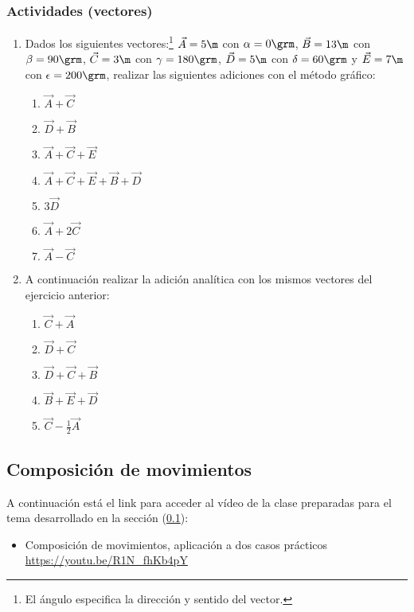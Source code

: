 \subsubsection*{Actividades (vectores)}
\small
\begin{enumerate}
  \item Dados los siguientes vectores:\footnote{El ángulo especifica la dirección
  y sentido del vector.} $\vec{A}=5\m$ con $\alpha=0\grm$,
  $\vec{B}=13\m$ con $\beta=90\grm$, $\vec{C}=3\m$ con $\gamma=180\grm$,
  $\vec{D}=5\m$ con $\delta=60\grm$ y $\vec{E}=7\m$ con $\epsilon=200\grm$,
  realizar las siguientes adiciones con el método gráfico:
    \begin{enumerate}
    \item $\vec{A}+\vec{C}$
    \item $\vec{D}+\vec{B}$
    \item $\vec{A}+\vec{C}+\vec{E}$
    \item $\vec{A}+\vec{C}+\vec{E}+\vec{B}+\vec{D}$
    \item $3\vec{D}$
    \item $\vec{A}+2\vec{C}$
    \item $\vec{A}-\vec{C}$
    \end{enumerate}
  \item A continuación realizar la adición analítica con los mismos vectores del
  ejercicio anterior:
    \begin{enumerate}
    \item $\vec{C}+\vec{A}$
    \item $\vec{D}+\vec{C}$
    \item $\vec{D}+\vec{C}+\vec{B}$
    \item $\vec{B}+\vec{E}+\vec{D}$
    \item $\vec{C}-\frac{1}{2}\vec{A}$
    \end{enumerate}
\end{enumerate}
\normalsize

\subsection{Composición de movimientos}
\label{c.cm}

A continuación está el link para acceder al vídeo de la clase
preparadas para el tema desarrollado en la sección (\ref{c.cm}):

\begin{itemize}
  \item Composición de movimientos, aplicación a dos casos prácticos \\
    \href{https://youtu.be/R1N\_fhKb4pY}{https://youtu.be/R1N\_fhKb4pY}
\end{itemize}

